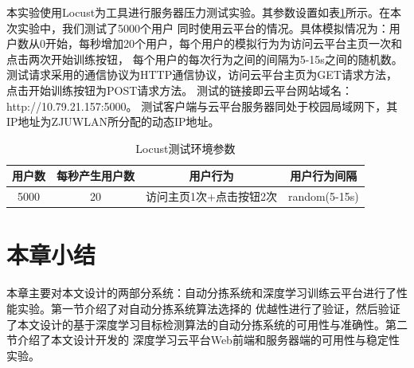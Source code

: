 本实验使用Locust\cite{locust}为工具进行服务器压力测试实验。其参数设置如表\ref{table:locust:param}所示。在本次实验中，我们测试了5000个用户
同时使用云平台的情况。具体模拟情况为：用户数从0开始，每秒增加20个用户，每个用户的模拟行为为访问云平台主页一次和点击两次开始训练按钮，
每个用户的每次行为之间的间隔为5-15s之间的随机数。测试请求采用的通信协议为HTTP通信协议，访问云平台主页为GET请求方法，点击开始训练按钮为POST请求方法。
测试的链接即云平台网站域名：http://10.79.21.157:5000。
测试客户端与云平台服务器同处于校园局域网下，其IP地址为ZJUWLAN所分配的动态IP地址。

{
    \begin{table}[htb]   
        \caption{Locust测试环境参数}
        \label{table:locust:param}
        \centering
        \begin{tabular}[t]{cccc}
            \hline
            用户数 & 每秒产生用户数 & 用户行为 & 用户行为间隔 \\
            \hline
            5000 & 20 & 访问主页1次+点击按钮2次  & random(5-15s) \\
            \hline
        \end{tabular}
    \end{table}
}



\section{本章小结}

本章主要对本文设计的两部分系统：自动分拣系统和深度学习训练云平台进行了性能实验。第一节介绍了对自动分拣系统算法选择的
优越性进行了验证，然后验证了本文设计的基于深度学习目标检测算法的自动分拣系统的可用性与准确性。第二节介绍了本文设计开发的
深度学习云平台Web前端和服务器端的可用性与稳定性实验。